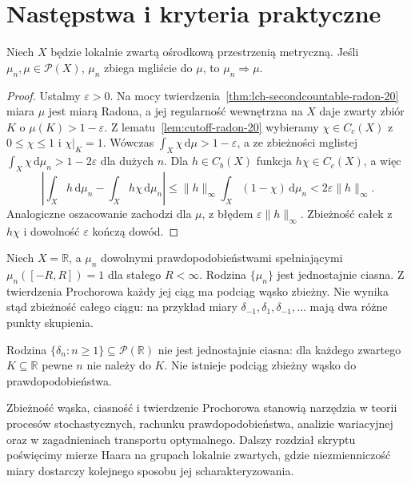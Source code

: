 \section{Następstwa i kryteria praktyczne}
\begin{wniosek}
\label{cor:vague-narrow-22}
Niech $X$ będzie lokalnie zwartą ośrodkową
przestrzenią metryczną. Jeśli $\mu_n,\mu\in\mathcal P(X)$,
$\mu_n$ zbiega mgliście do $\mu$, to
$\mu_n\Rightarrow\mu$.
\end{wniosek}
\begin{proof}
Ustalmy $\varepsilon>0$. Na mocy twierdzenia~\ref{thm:lch-secondcountable-radon-20}
miara $\mu$ jest miarą Radona, a jej regularność
wewnętrzna na $X$ daje zwarty zbiór $K$ o
$\mu(K)>1-\varepsilon$.
Z lematu~\ref{lem:cutoff-radon-20} wybieramy
$\chi\in C_c(X)$ z $0\le\chi\le1$ i $\chi|_K=1$. Wówczas
$\int_X\chi\,\mathrm d\mu>1-\varepsilon$,
a ze zbieżności mglistej
$\int_X\chi\,\mathrm d\mu_n>1-2\varepsilon$
dla dużych $n$. Dla $h\in C_b(X)$
funkcja $h\chi\in C_c(X)$, a więc
\[
\left|\int_Xh\,\mathrm d\mu_n-
\int_Xh\chi\,\mathrm d\mu_n\right|
\le\|h\|_\infty\int_X(1-\chi)\,\mathrm d\mu_n
<2\varepsilon\|h\|_\infty.
\]
Analogiczne oszacowanie zachodzi dla $\mu$,
z błędem $\varepsilon\|h\|_\infty$.
Zbieżność całek z $h\chi$ i dowolność $\varepsilon$
kończą dowód.
\end{proof}

\begin{przyklad}
Niech $X=\mathbb R$, a $\mu_n$ dowolnymi
prawdopodobieństwami spełniającymi
$\mu_n([-R,R])=1$ dla stałego $R<\infty$.
Rodzina $\{\mu_n\}$ jest jednostajnie ciasna.
Z twierdzenia Prochorowa każdy jej ciąg ma podciąg
wąsko zbieżny. Nie wynika stąd zbieżność całego ciągu:
na przykład miary $\delta_{-1},\delta_1,\delta_{-1},\ldots$
mają dwa różne punkty skupienia.
\end{przyklad}

\begin{przyklad}
Rodzina $\{\delta_n:n\ge1\}\subseteq\mathcal P(\mathbb R)$
nie jest jednostajnie ciasna: dla każdego zwartego
$K\subseteq\mathbb R$ pewne $n$ nie należy do $K$.
Nie istnieje podciąg zbieżny wąsko do prawdopodobieństwa.
\end{przyklad}

\begin{uwaga}
Zbieżność wąska, ciasność i twierdzenie Prochorowa
stanowią narzędzia w teorii procesów stochastycznych,
rachunku prawdopodobieństwa, analizie wariacyjnej
oraz w zagadnieniach transportu optymalnego.
Dalszy rozdział skryptu poświęcimy mierze Haara
na grupach lokalnie zwartych, gdzie niezmienniczość
miary dostarczy kolejnego sposobu jej scharakteryzowania.
\end{uwaga}
